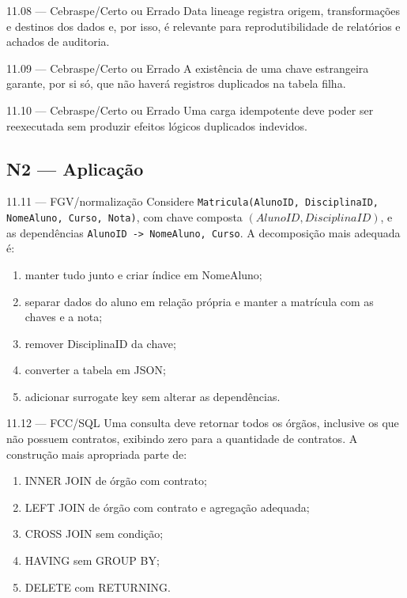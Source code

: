 \begin{questao}{ 11.08 — Cebraspe/Certo ou Errado}
Data lineage registra origem, transformações e destinos dos dados e, por isso, é relevante para reprodutibilidade de relatórios e achados de auditoria.
\end{questao}

\begin{questao}{ 11.09 — Cebraspe/Certo ou Errado}
A existência de uma chave estrangeira garante, por si só, que não haverá registros duplicados na tabela filha.
\end{questao}

\begin{questao}{ 11.10 — Cebraspe/Certo ou Errado}
Uma carga idempotente deve poder ser reexecutada sem produzir efeitos lógicos duplicados indevidos.
\end{questao}

\subsection*{N2 — Aplicação}

\begin{questao}{ 11.11 — FGV/normalização}
Considere \texttt{Matricula(AlunoID, DisciplinaID, NomeAluno, Curso, Nota)}, com chave composta $(AlunoID,DisciplinaID)$, e as dependências \texttt{AlunoID -> NomeAluno, Curso}. A decomposição mais adequada é:
\begin{enumerate}[label=\Alph*)]
\item manter tudo junto e criar índice em NomeAluno;
\item separar dados do aluno em relação própria e manter a matrícula com as chaves e a nota;
\item remover DisciplinaID da chave;
\item converter a tabela em JSON;
\item adicionar surrogate key sem alterar as dependências.
\end{enumerate}
\end{questao}

\begin{questao}{ 11.12 — FCC/SQL}
Uma consulta deve retornar todos os órgãos, inclusive os que não possuem contratos, exibindo zero para a quantidade de contratos. A construção mais apropriada parte de:
\begin{enumerate}[label=\Alph*)]
\item INNER JOIN de órgão com contrato;
\item LEFT JOIN de órgão com contrato e agregação adequada;
\item CROSS JOIN sem condição;
\item HAVING sem GROUP BY;
\item DELETE com RETURNING.
\end{enumerate}
\end{questao}

